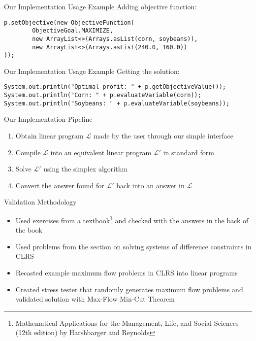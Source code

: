 \documentclass{beamer}
\begin{document}
\begin{frame}[fragile]{Our Implementation Usage Example}
    Adding objective function:
    
    \begin{verbatim}
p.setObjective(new ObjectiveFunction(
        ObjectiveGoal.MAXIMIZE,
        new ArrayList<>(Arrays.asList(corn, soybeans)),
        new ArrayList<>(Arrays.asList(240.0, 160.0))
));
    \end{verbatim}
\end{frame}

\begin{frame}[fragile]{Our Implementation Usage Example}
    Getting the solution:
    
    \begin{verbatim}
System.out.println("Optimal profit: " + p.getObjectiveValue());
System.out.println("Corn: " + p.evaluateVariable(corn));
System.out.println("Soybeans: " + p.evaluateVariable(soybeans));
    \end{verbatim}
\end{frame}

\begin{frame}{Our Implementation Pipeline}
    \begin{enumerate}
        \item<1-> Obtain linear program $\mathcal{L}$ made by the user through our simple interface
        \item<2-> Compile $\mathcal{L}$ into an equivalent linear program $\mathcal{L'}$ in standard form
        \item<3-> Solve $\mathcal{L'}$ using the simplex algorithm
        \item<4-> Convert the answer found for $\mathcal{L'}$ back into an answer in $\mathcal{L}$
    \end{enumerate}
\end{frame}

\begin{frame}{Validation Methodology}
    \begin{itemize}
        \item<1-> Used exercises from a textbook\footnote{Mathematical Applications for the Management, Life, and Social Sciences (12th edition) by Harshbarger and Reynolds} and checked with the answers in the back of the book
        \item<2-> Used problems from the section on solving systems of difference constraints in CLRS
        \item<3-> Recasted example maximum flow problems in CLRS into linear programs
        \item<4-> Created stress tester that randomly generates maximum flow problems and validated solution with Max-Flow Min-Cut Theorem
    \end{itemize}
\end{frame}
\end{document}
